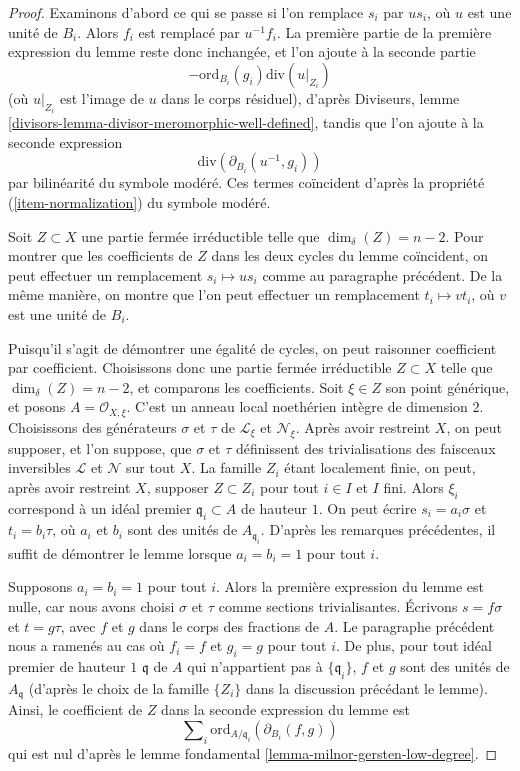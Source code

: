 \begin{proof}
Examinons d'abord ce qui se passe si l'on remplace $s_i$ par $us_i$,
où $u$ est une unité de $B_i$. Alors $f_i$ est remplacé par $u^{-1} f_i$.
La première partie de la première expression du lemme reste donc inchangée,
et l'on ajoute à la seconde partie
$$
-\text{ord}_{B_i}(g_i)\text{div}(u|_{Z_i})
$$
(où $u|_{Z_i}$ est l'image de $u$ dans le corps résiduel), d'après
Diviseurs, lemme \ref{divisors-lemma-divisor-meromorphic-well-defined},
tandis que l'on ajoute à la seconde expression
$$
\text{div}(\partial_{B_i}(u^{-1}, g_i))
$$
par bilinéarité du symbole modéré. Ces termes coïncident d'après la propriété
(\ref{item-normalization}) du symbole modéré.

\medskip\noindent
Soit $Z \subset X$ une partie fermée irréductible telle que $\dim_\delta(Z) = n - 2$.
Pour montrer que les coefficients de $Z$ dans les deux cycles du lemme
coïncident, on peut effectuer un remplacement $s_i \mapsto us_i$ comme au
paragraphe précédent. De la même manière, on montre que l'on peut effectuer un remplacement
$t_i \mapsto vt_i$, où $v$ est une unité de $B_i$.

\medskip\noindent
Puisqu'il s'agit de démontrer une égalité de cycles, on peut raisonner coefficient
par coefficient. Choisissons donc une partie fermée irréductible $Z \subset X$
telle que $\dim_\delta(Z) = n - 2$, et comparons les coefficients. Soit $\xi \in Z$
son point générique, et posons $A = \mathcal{O}_{X, \xi}$. C'est un anneau local
noethérien intègre de dimension $2$. Choisissons des générateurs $\sigma$ et $\tau$
de $\mathcal{L}_\xi$ et $\mathcal{N}_\xi$. Après avoir restreint $X$, on peut
supposer, et l'on suppose, que $\sigma$ et $\tau$ définissent des trivialisations
des faisceaux inversibles $\mathcal{L}$ et $\mathcal{N}$ sur tout $X$.
La famille $Z_i$ étant localement
finie, on peut, après avoir restreint $X$, supposer $Z \subset Z_i$ pour tout $i \in I$
et $I$ fini. Alors $\xi_i$ correspond à un idéal premier
$\mathfrak q_i \subset A$ de hauteur $1$.
On peut écrire $s_i = a_i \sigma$ et $t_i = b_i \tau$,
où $a_i$ et $b_i$ sont des unités de $A_{\mathfrak q_i}$.
D'après les remarques précédentes, il suffit de démontrer le lemme lorsque
$a_i = b_i = 1$ pour tout $i$.

\medskip\noindent
Supposons $a_i = b_i = 1$ pour tout $i$. Alors la première expression du
lemme est nulle, car nous avons choisi $\sigma$ et $\tau$ comme sections
trivialisantes. Écrivons $s = f\sigma$ et $t = g \tau$, avec $f$ et $g$ dans le
corps des fractions de $A$. Le paragraphe précédent nous a ramenés au cas où
$f_i = f$ et $g_i = g$ pour tout $i$. De plus, pour tout idéal premier de hauteur $1$
$\mathfrak q$ de $A$ qui n'appartient pas à $\{\mathfrak q_i\}$,
$f$ et $g$ sont des unités de $A_\mathfrak q$ (d'après le choix de
la famille $\{Z_i\}$ dans la discussion précédant le lemme). Ainsi,
le coefficient de $Z$ dans la seconde expression du lemme est
$$
\sum\nolimits_i \text{ord}_{A/\mathfrak q_i}(\partial_{B_i}(f, g))
$$
qui est nul d'après le lemme fondamental \ref{lemma-milnor-gersten-low-degree}.
\end{proof}

